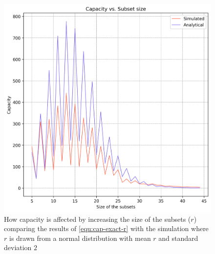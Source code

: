         \begin{figure}%
            \centering
            \includegraphics[scale=0.83]{figures/cap-vs-r-bounded-exact-2.png}
            \caption[Capacity vs. Size of the subsets ($r$)]{How capacity is affected by increasing the size of the subsets ($r$) comparing the results of \ref{equ:cap-exact-r} with the simulation where $r$ is drawn from a normal distribution with mean $r$ and standard deviation $2$}
            \label{figure:cap-vs-r-bounded-exact-2}
            \end{figure}

